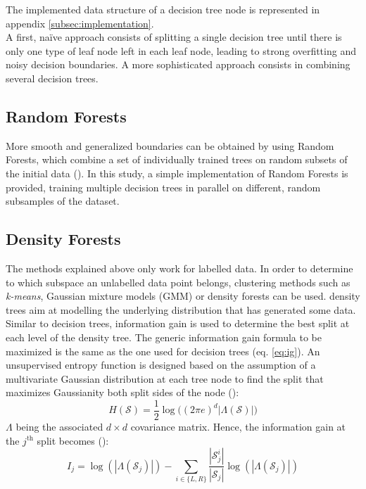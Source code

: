 \documentclass{article}
\begin{document}
The implemented data structure of a decision tree node is represented in appendix \ref{subsec:implementation}.\\

A first, naïve approach consists of splitting a single decision tree until there is only one type of leaf node left in each leaf node, leading to  strong overfitting and noisy decision boundaries. A more sophisticated approach consists in combining several decision trees.

\subsection{Random Forests}
 More smooth and generalized boundaries can be obtained by using Random Forests, which combine a set of individually trained trees on random subsets of the initial data (\cite{decisionForests-MSR, Breiman2001}). In this study, a simple implementation of Random Forests is provided, training multiple decision trees in parallel on different, random subsamples of the dataset.\\

\subsection{Density Forests}
The methods explained above only work for labelled data. In order to determine to which subspace an unlabelled data point belongs, clustering methods such as \textit{k-means}, Gaussian mixture models (GMM) or density forests can be used. density trees aim at modelling the underlying distribution that has generated some data. Similar to decision trees, information gain is used to determine the best split at each level of the density tree. The generic information gain formula to be maximized is the same as the one used for decision trees (eq. \ref{eq:ig}). An unsupervised entropy function is designed based on the assumption of a multivariate Gaussian distribution at each tree node to find the split that maximizes Gaussianity both split sides of the node (\cite{decisionForests-MSR}):
\begin{equation}
    H(\mathcal{S}) = \frac{1}{2}\log\Big((2\pi e)^d|\mathtt{\Lambda}(\mathcal{S})|\Big)
\end{equation}
$\mathtt{\Lambda}$ being the associated $d \times d$ covariance matrix. Hence, the information gain at the $j^{\text{th}}$ split becomes (\cite{decisionForests-MSR}):
\begin{equation}
    I_j = \log(|\mathtt{\Lambda}(\mathcal{S}_j)|) - \sum_{i\in \{L, R\}}\frac{|\mathcal{S}_j^i|}{|\mathcal{S}_j|}\log(|\mathtt{\Lambda}(\mathcal{S}_j)|)
\end{equation}
\end{document}
